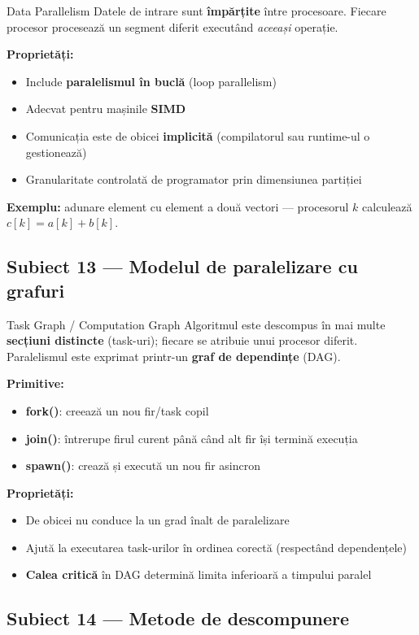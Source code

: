 \documentclass[a4paper,11pt]{article}
\newcommand{\subiect}[2]{\subsection{Subiect \textcolor{numcol}{#1} — #2}}
\begin{document}
\begin{defbox}{Data Parallelism}
Datele de intrare sunt \textbf{împărțite} între procesoare. Fiecare procesor procesează un segment diferit executând \emph{aceeași} operație.
\end{defbox}

\textbf{Proprietăți:}
\begin{itemize}[noitemsep]
  \item Include \textbf{paralelismul în buclă} (loop parallelism)
  \item Adecvat pentru mașinile \textbf{SIMD}
  \item Comunicația este de obicei \textbf{implicită} (compilatorul sau runtime-ul o gestionează)
  \item Granularitate controlată de programator prin dimensiunea partiției
\end{itemize}

\textbf{Exemplu:} adunare element cu element a două vectori — procesorul $k$ calculează $c[k] = a[k] + b[k]$.

\subiect{13}{Modelul de paralelizare cu grafuri}

\begin{defbox}{Task Graph / Computation Graph}
Algoritmul este descompus în mai multe \textbf{secțiuni distincte} (task-uri); fiecare se atribuie unui procesor diferit. Paralelismul este exprimat printr-un \textbf{graf de dependințe} (DAG).
\end{defbox}

\textbf{Primitive:}
\begin{itemize}[noitemsep]
  \item \textbf{fork()}: creează un nou fir/task copil
  \item \textbf{join()}: întrerupe firul curent până când alt fir își termină execuția
  \item \textbf{spawn()}: crează și execută un nou fir asincron
\end{itemize}

\textbf{Proprietăți:}
\begin{itemize}[noitemsep]
  \item De obicei nu conduce la un grad înalt de paralelizare
  \item Ajută la executarea task-urilor în ordinea corectă (respectând dependențele)
  \item \textbf{Calea critică} în DAG determină limita inferioară a timpului paralel
\end{itemize}

\subiect{14}{Metode de descompunere}
\end{document}
